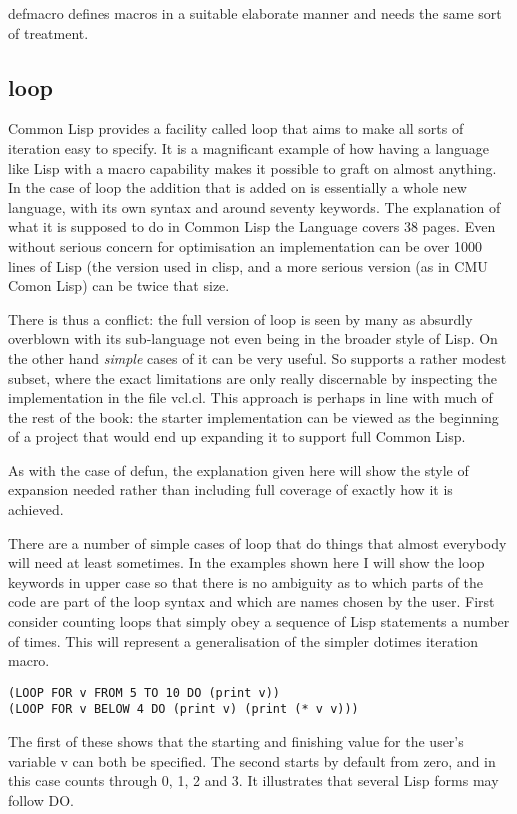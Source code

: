 {\tx defmacro} defines macros in a suitable elaborate manner and needs the
same sort of treatment.

\subsection{{\tx loop}}
Common Lisp provides a facility called {\tx loop} that aims to make all
sorts of iteration easy to specify. It is a magnificant example of how having
a language like Lisp with a macro capability makes it possible to graft on
almost anything. In the case of {\tx loop} the addition that is added on
is essentially a whole new language, with its own syntax and around
seventy keywords. The explanation of what it is supposed to do in
Common Lisp the Language\cite{Steele:1990:CLL} covers 38 pages.
Even without serious concern for optimisation an implementation can be
over 1000 lines of Lisp (the version used in {\tx clisp}\cite{clisp},
and a more serious version (as in CMU Comon Lisp\cite{McDonald:1987:CCL})
can be twice that size. 

There is thus a conflict: the full version of {\tx loop} is seen by many
as absurdly overblown with its sub-language not even being in the broader
style of Lisp. On the other hand {\em simple} cases of it can be very
useful. So \vcl{} supports a rather modest subset, where the exact limitations
are only really discernable by inspecting the implementation in the
file {\tx vcl.cl}. This approach is perhaps in line with much of the
rest of the book: the starter implementation can be viewed as the beginning
of a project that would end up expanding it to support full Common Lisp.

As with the case of {\tx defun}, the explanation given here will show the
style of expansion needed rather than including full coverage of exactly how
it is achieved.

There are a number of simple cases of {\tx loop} that do things that almost
everybody will need at least sometimes. In the examples shown here I will show the loop keywords in
upper case so that there is no ambiguity as to which parts of the
code are part of the {\tx loop} syntax and which are names chosen by the
user. First consider counting loops
that simply obey a sequence of Lisp statements a number of times. This
will represent a generalisation of the simpler {\tx dotimes} iteration
macro. 
{\small\begin{verbatim}
(LOOP FOR v FROM 5 TO 10 DO (print v))
(LOOP FOR v BELOW 4 DO (print v) (print (* v v)))
\end{verbatim}}
The first of these shows that the starting and finishing value for the
user's variable {\tx v} can both be specified. The second starts by
default from zero, and in this case counts through 0, 1, 2 and 3. It
illustrates that several Lisp forms may follow {\tx DO}.

